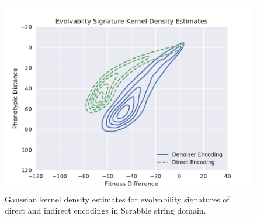 \begin{figure}
  \includegraphics[width=0.8\linewidth]{img/scrabble_es_kde}
  \caption{
    Gaussian kernel density estimates for evolvability signatures of direct and indirect encodings in Scrabble string domain.
  }\label{fig:scrabble_es_kde}
\end{figure}
